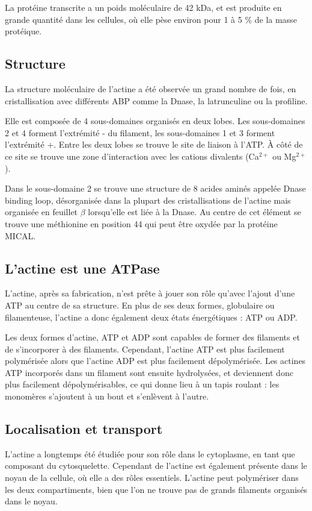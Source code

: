 \documentclass{report}
\begin{document}
La protéine transcrite a un poids moléculaire de 42 kDa, et est produite en grande quantité dans les cellules, où elle pèse environ pour 1 à 5 \% de la masse protéique. 

\subsection{Structure}
La structure moléculaire de l'actine a été observée un grand nombre de fois, en cristallisation avec différents ABP comme la Dnase, la latrunculine ou la profiline. 


Elle est composée de 4 sous-domaines organisés en deux lobes. Les sous-domaines 2 et 4 forment l'extrémité - du filament, les sous-domaines 1 et 3 forment l'extrémité +. Entre les deux lobes se trouve le site de liaison à l'ATP. 
À côté de ce site se trouve une zone d'interaction avec les cations divalents (Ca$^{2+}$ ou Mg$^{2+}$). 

Dans le sous-domaine 2 se trouve une structure de 8 acides aminés appelée Dnase binding loop, désorganisée dans la plupart des cristallisations de l'actine mais organisée en feuillet $\beta$ lorsqu'elle est liée à la Dnase. Au centre de cet élément se trouve une méthionine en position 44 qui peut être oxydée par la protéine MICAL. 

\subsection{L'actine est une ATPase}

L'actine, après sa fabrication, n'est prête à jouer son rôle qu'avec l'ajout d'une ATP au centre de sa structure.
En plus de ses deux formes, globulaire ou filamenteuse, l'actine a donc également deux états énergétiques : ATP ou ADP.

Les deux formes d'actine, ATP et ADP sont capables de former des filaments et de s'incorporer à des filaments. 
Cependant, l'actine ATP est plus facilement polymérisée alors que l'actine ADP est plus facilement dépolymérisée. 
Les actines ATP incorporés dans un filament sont ensuite hydrolysées, et deviennent donc plus facilement dépolymérisables, ce qui donne lieu à un tapis roulant : les monomères s'ajoutent à un bout et s'enlèvent à l'autre. 

\subsection{Localisation et transport}

L'actine a longtemps été étudiée pour son rôle dans le cytoplasme, en tant que composant du cytosquelette. Cependant de l'actine est également présente dans le noyau de la cellule, où elle a des rôles essentiels. 
L'actine peut polymériser dans les deux compartiments, bien que l'on ne trouve pas de grands filaments organisés dans le noyau. 
\end{document}
